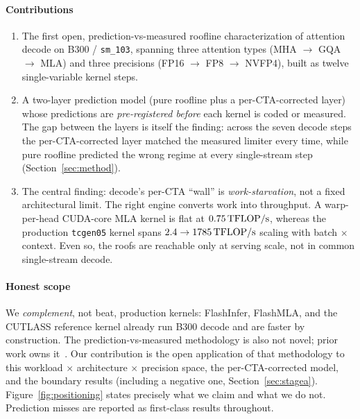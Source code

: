 \paragraph{Contributions}
\begin{enumerate}
  \item The first open, prediction-vs-measured roofline characterization of
  attention decode on B300 / \texttt{sm\_103}, spanning three attention types
  (MHA $\to$ GQA $\to$ MLA) and three precisions (FP16 $\to$ FP8 $\to$ NVFP4),
  built as twelve single-variable kernel steps.
  \item A two-layer prediction model (pure roofline plus a per-CTA-corrected
  layer) whose predictions are \emph{pre-registered before} each kernel is coded
  or measured. The gap between the layers is itself the finding: across the seven
  decode steps the per-CTA-corrected layer matched the measured limiter every
  time, while pure roofline predicted the wrong regime at every single-stream
  step (Section~\ref{sec:method}).
  \item The central finding: decode's per-CTA ``wall'' is
  \emph{work-starvation}, not a fixed architectural limit. The right engine
  converts work into throughput. A warp-per-head CUDA-core MLA kernel is flat at
  $0.75\,\text{TFLOP/s}$, whereas the production \texttt{tcgen05} kernel spans
  $2.4 \to 1785\,\text{TFLOP/s}$ scaling with batch $\times$ context. Even so, the roofs
  are reachable only at serving scale, not in common single-stream decode.
\end{enumerate}

\paragraph{Honest scope}
We \emph{complement}, not beat, production kernels: FlashInfer, FlashMLA, and the
CUTLASS reference kernel already run B300 decode and are faster by construction.
The prediction-vs-measured methodology is also not novel; prior work owns
it~\cite{roofmethod}. Our contribution is the open application of that methodology
to this workload $\times$ architecture $\times$ precision space, the
per-CTA-corrected model, and the boundary results (including a negative one,
Section~\ref{sec:stagea}). Figure~\ref{fig:positioning} states precisely what we
claim and what we do not. Prediction misses are reported as first-class results
throughout.
